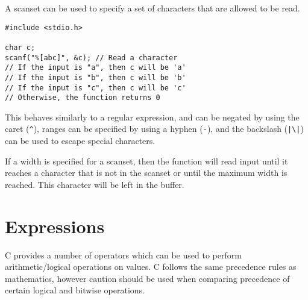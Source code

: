 \documentclass[a4paper]{report}
\begin{document}
A scanset can be used to specify a set of characters that are allowed
to be read.
\begin{verbatim}
#include <stdio.h>

char c;
scanf("%[abc]", &c); // Read a character
// If the input is "a", then c will be 'a'
// If the input is "b", then c will be 'b'
// If the input is "c", then c will be 'c'
// Otherwise, the function returns 0
\end{verbatim}
This behaves similarly to a regular expression, and can be negated by
using the caret (\texttt{^}), ranges can be specified by using a
hyphen (\texttt{-}), and the backslash
(\texttt{|\backslash|}) can be used to escape
special characters.

If a width is specified for a scanset, then the function will read
input until it reaches a character that is not in the scanset or until
the maximum width is reached. This character will be left in the
buffer.
\chapter{Expressions}
C provides a number of operators which can be used to perform
arithmetic/logical operations on values. C follows the same precedence
rules as mathematics, however caution should be used when comparing
precedence of certain logical and bitwise operations.
\end{document}
